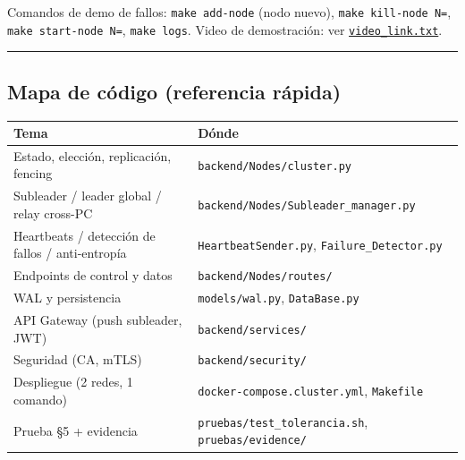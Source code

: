 \documentclass[11pt]{article}
\begin{document}
Comandos de demo de fallos: \texttt{make add-node} (nodo nuevo), \texttt{make kill-node N=}, \texttt{make start-node N=}, \texttt{make logs}. Video de demostración: ver \href{video\_link.txt}{\texttt{video\_\allowbreak{}link.\allowbreak{}txt}}.

\vspace{2pt}\noindent\rule{\textwidth}{0.4pt}\vspace{2pt}

\subsection{Mapa de código (referencia rápida)}

\begin{center}\footnotesize
\begin{tabular}{|>{\raggedright\arraybackslash}p{}|>{\raggedright\arraybackslash}p{}|}
\hline
\textbf{Tema} & \textbf{Dónde} \\ \hline
Estado, elección, replicación, fencing & \texttt{backend/\allowbreak{}Nodes/\allowbreak{}cluster.\allowbreak{}py} \\ \hline
Subleader / leader global / relay cross-PC & \texttt{backend/\allowbreak{}Nodes/\allowbreak{}Subleader\_\allowbreak{}manager.\allowbreak{}py} \\ \hline
Heartbeats / detección de fallos / anti-entropía & \texttt{HeartbeatSender.\allowbreak{}py}, \texttt{Failure\_\allowbreak{}Detector.\allowbreak{}py} \\ \hline
Endpoints de control y datos & \texttt{backend/\allowbreak{}Nodes/\allowbreak{}routes/\allowbreak{}} \\ \hline
WAL y persistencia & \texttt{models/\allowbreak{}wal.\allowbreak{}py}, \texttt{DataBase.\allowbreak{}py} \\ \hline
API Gateway (push subleader, JWT) & \texttt{backend/\allowbreak{}services/\allowbreak{}} \\ \hline
Seguridad (CA, mTLS) & \texttt{backend/\allowbreak{}security/\allowbreak{}} \\ \hline
Despliegue (2 redes, 1 comando) & \texttt{docker-compose.\allowbreak{}cluster.\allowbreak{}yml}, \texttt{Makefile} \\ \hline
Prueba §5 + evidencia & \texttt{pruebas/\allowbreak{}test\_\allowbreak{}tolerancia.\allowbreak{}sh}, \texttt{pruebas/\allowbreak{}evidence/\allowbreak{}} \\ \hline
\end{tabular}
\end{center}
\end{document}
